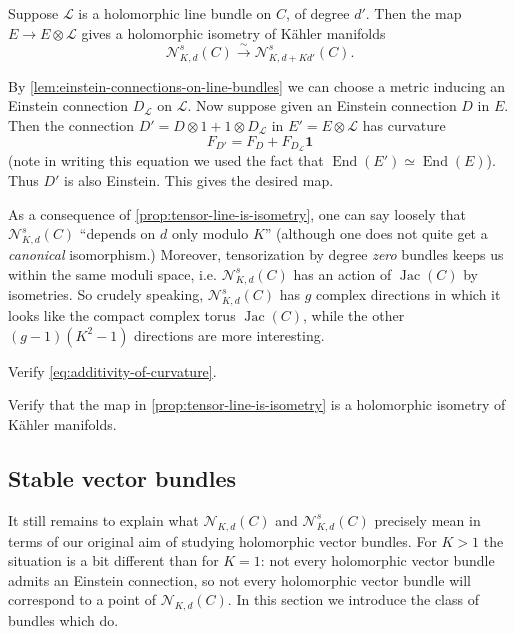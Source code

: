\documentclass[12pt,letterpaper,reqno]{article}
\numberwithin{equation}{section}
\newcommand{\cL}{\ensuremath{\mathcal L}}
\newcommand{\cN}{\ensuremath{\mathcal N}}
\newcommand{\kahler}{K\"ahler\xspace}
\newcommand\bid{{\mathbf 1}}
\newcommand{\simarrow}{\xrightarrow\sim}
\newcommand{\ti}[1]{\textit{#1}}
\DeclareMathOperator{\End}{End}
\DeclareMathOperator{\Jac}{Jac}
\begin{document}
\begin{prop} \label{prop:tensor-line-is-isometry}
Suppose $\cL$ is a holomorphic line bundle on $C$, of degree $d'$.
Then the map $E \to E \otimes \cL$ gives a holomorphic 
isometry of \kahler manifolds
\begin{equation}
\cN^s_{K,d}(C) \simarrow \cN^s_{K,d+Kd'}(C).
\end{equation}
\end{prop}
\begin{pf}
By \autoref{lem:einstein-connections-on-line-bundles} we can choose 
a metric inducing an Einstein connection $D_\cL$ on $\cL$. Now 
suppose given an Einstein connection $D$ in $E$. Then the connection
$D' = D \otimes 1 + 1 \otimes D_\cL$ in $E' = E \otimes \cL$ has curvature 
\begin{equation} \label{eq:additivity-of-curvature}
 F_{D'} = F_D + F_{D_\cL} \bid
\end{equation}
(note in writing this equation we used
the fact that $\End(E') \simeq \End(E)$).
Thus $D'$ is also Einstein. This gives the desired map.
\end{pf}

As a consequence of \autoref{prop:tensor-line-is-isometry}, one can say
loosely that $\cN_{K,d}^s(C)$ ``depends on $d$ only modulo $K$''
(although one does not quite get a \ti{canonical} isomorphism.)
Moreover, tensorization by degree \ti{zero} bundles keeps us within
the same moduli space, i.e. $\cN_{K,d}^s(C)$ has an action of $\Jac(C)$ by isometries. 
So crudely speaking, $\cN_{K,d}^s(C)$ has $g$ complex directions in which 
it looks like the compact complex torus $\Jac(C)$, while the other
$(g-1)(K^2-1)$ directions are more interesting.

\begin{exercise} Verify \eqref{eq:additivity-of-curvature}.
\end{exercise}

\begin{exercise} Verify that the map in 
\autoref{prop:tensor-line-is-isometry} is a holomorphic
isometry of \kahler manifolds.
\end{exercise}




\subsection{Stable vector bundles}

It still remains to explain what $\cN_{K,d}(C)$ and $\cN_{K,d}^s(C)$ precisely
mean in terms of our original aim of studying holomorphic vector bundles.
For $K > 1$ the situation is a bit different than for $K=1$:
not every holomorphic vector bundle admits an Einstein connection,
so not every holomorphic vector bundle will correspond to a point of 
$\cN_{K,d}(C)$.
In this section we introduce the class of bundles which do.
\end{document}
